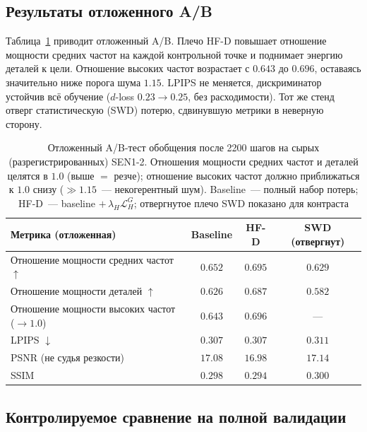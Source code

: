 \subsection{Результаты отложенного A/B}

Таблица~\ref{tab:hfd_ab} приводит отложенный A/B. Плечо HF-D повышает отношение
мощности средних частот на каждой контрольной точке и поднимает энергию деталей к
цели. Отношение высоких частот возрастает с $0.643$ до $0.696$, оставаясь
значительно ниже порога шума $1.15$. LPIPS не меняется, дискриминатор устойчив всё
обучение ($d$-loss $0.23\!\to\!0.25$, без расходимости). Тот же стенд отверг
статистическую (SWD) потерю, сдвинувшую метрики в неверную сторону.

\begin{table}[H]
  \centering
  \caption{Отложенный A/B-тест обобщения после 2200 шагов на сырых
           (разрегистрированных) SEN1-2. Отношения мощности средних частот и деталей
           целятся в $1.0$ (выше $=$ резче); отношение высоких частот должно
           приближаться к $1.0$ снизу ($\gg 1.15$~--- некогерентный шум).
           Baseline~--- полный набор потерь; HF-D~--- baseline $+\,\lambda_H
           \mathcal{L}^G_H$; отвергнутое плечо SWD показано для контраста}
  \label{tab:hfd_ab}
  \begin{tabular}{lccc}
    \toprule
    Метрика (отложенная) & Baseline & \textbf{HF-D} & SWD (отвергнут) \\
    \midrule
    Отношение мощности средних частот $\uparrow$ & $0.652$ & $\mathbf{0.695}$ & $0.629$ \\
    Отношение мощности деталей $\uparrow$         & $0.626$ & $\mathbf{0.687}$ & $0.582$ \\
    Отношение мощности высоких частот ($\to 1.0$) & $0.643$ & $0.696$      & --- \\
    LPIPS $\downarrow$                   & $0.307$ & $0.307$          & $0.311$ \\
    PSNR (не судья резкости)             & $17.08$ & $16.98$          & $17.14$ \\
    SSIM                                 & $0.298$ & $0.294$          & $0.300$ \\
    \bottomrule
  \end{tabular}
\end{table}

\subsection{Контролируемое сравнение на полной валидации}

